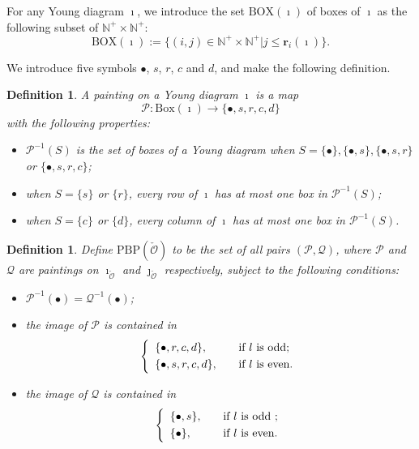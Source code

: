 \documentclass[lang = american]{ems-icm} %
\newcommand{\CO}{{\mathcal {O}}}
\newcommand{\CP}{{\mathcal {P}}}
\newcommand{\CQ}{{\mathcal {Q}}}
\numberwithin{equation}{section}
\newtheorem{defn}[thm]{Definition}
\theoremstyle{remark}
\begin{document}
For any Young diagram $\imath$, we introduce the set $\mathrm{BOX}(\imath)$ of boxes of $\imath$ as the following subset
of $\mathbb N^+\times \mathbb N^+$:
\begin{equation*}\label{eq:BOX}
\mathrm{BOX}(\imath):=\{(i,j)\in\mathbb N^+\times \mathbb N^+| j\leq \mathbf r_i(\imath)\}.
\end{equation*}


We introduce five symbols $\bullet$, $s$, $r$, $c$ and $d$, and make the following definition.

\begin{defn}
A painting on a Young diagram $\imath$ is a map
\[
  \CP: \mathrm{Box}(\imath) \rightarrow \{\bullet, s, r, c, d \}
\]
with the following properties:
\begin{itemize}
\item
 $\CP^{-1}(S)$ is the set of boxes of a Young diagram when $S=\{\bullet\}, \{\bullet, s \}, \{\bullet, s, r\}$ or $\{\bullet, s, r, c \} $;
 \item
 when $S=\{s\}$ or $ \{r\}$, every row of $\imath$ has at most one  box in $\CP^{-1}(S)$;
   \item
 when $S=\{c\}$ or $ \{d \}$, every column of $\imath$ has at most one  box in $\CP^{-1}(S)$.
 \end{itemize}
\end{defn}



\begin{defn}\label{defpbp0}
Define $\mathrm{PBP}(\check \CO)$ to be the set of all pairs $(\CP, \CQ)$, where $\CP$ and $\CQ$ are paintings on $\imath_{\check \CO}$ and $\jmath_{\check \CO}$ respectively, subject to the following conditions:
 \begin{itemize}
  \item
 $\CP^{-1}(\bullet)=\CQ^{-1}(\bullet)$;
 \item
 the image of $\CP$ is contained in
 \[
 \left\{
     \begin{array}{ll}
         \{\bullet,  r, c,d\}, &\quad \hbox{if $l$ is odd};\smallskip\\
\{\bullet, s, r, c,d\}, &\quad \hbox{if $l$ is even}
                  .
                     \end{array}
   \right.
 \]
 \item
 the image of $\CQ$ is contained in
 \[
 \left\{
     \begin{array}{ll}
   \{\bullet, s\}, &\quad \hbox{if  $l$ is odd }; \smallskip\\
         \{\bullet\}, &\quad \hbox{if $l$ is even}.

            \end{array}
   \right.
 \]

 \end{itemize}
 \end{defn}
\end{document}
